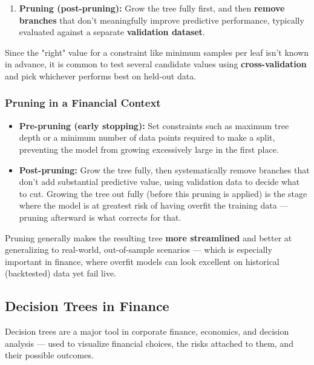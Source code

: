 \documentclass[12pt,openany]{book}
\begin{document}
\begin{enumerate}[leftmargin=*]
    \item \textbf{Pruning (post-pruning):} Grow the tree fully first, and then \textbf{remove branches} that don't meaningfully improve predictive performance, typically evaluated against a separate \textbf{validation dataset}.

\end{enumerate}

Since the "right" value for a constraint like minimum samples per leaf isn't known in advance, it is common to test several candidate values using \textbf{cross-validation} and pick whichever performs best on held-out data.

\subsubsection{Pruning in a Financial Context}

\begin{itemize}[leftmargin=*]
    \item \textbf{Pre-pruning (early stopping):} Set constraints such as maximum tree depth or a minimum number of data points required to make a split, preventing the model from growing excessively large in the first place.
    \item \textbf{Post-pruning:} Grow the tree fully, then systematically remove branches that don't add substantial predictive value, using validation data to decide what to cut. Growing the tree out fully (before this pruning is applied) is the stage where the model is at greatest risk of having overfit the training data --- pruning afterward is what corrects for that.

\end{itemize}

Pruning generally makes the resulting tree \textbf{more streamlined} and better at generalizing to real-world, out-of-sample scenarios --- which is especially important in finance, where overfit models can look excellent on historical (backtested) data yet fail live.

\medskip


\subsection{Decision Trees in Finance}


Decision trees are a major tool in corporate finance, economics, and decision analysis --- used to visualize financial choices, the risks attached to them, and their possible outcomes.
\end{document}
